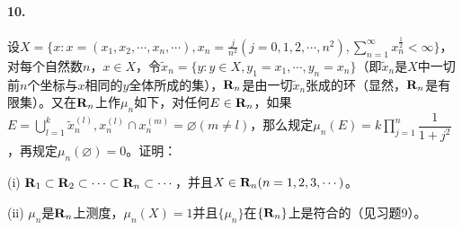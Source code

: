 \documentclass[12pt, a4paper, oneside]{ctexart}
\begin{document}
\paragraph{10.}设$\displaystyle X=\{x:x=(x_1,x_2,\cdots, x_n,\cdots),x_n=\frac{j}{n^2}(j=0,1,2,\cdots,n^2),\sum\limits_{n=1}^{\infty}x_n^{\frac{1}{2}}<\infty\}$，对每个自然数$n$，$x\in X$，令$\widetilde{x}_n = \{y:y\in X, y_1=x_1,\cdots,y_n=x_n\}$（即$\widetilde{x}_n$是$X$中一切前$n$个坐标与$x$相同的$y$全体所成的集），$\mathbf{R}_n$是由一切$\widetilde{x}_n$张成的环（显然，$\mathbf{R}_n$是有限集）。又在$\mathbf{R}_n$上作$\mu_n$如下，对任何$E\in\mathbf{R}_n$，如果$\displaystyle E=\bigcup\limits_{l=1}^k\widetilde{x}_n^{(l)},x_n^{(l)}\cap x_n^{(m)}=\varnothing(m\neq l)$，那么规定$\displaystyle \mu_n(E) = k\prod\limits_{j=1}^n\dfrac{1}{1+j^2}$，再规定$\mu_n(\varnothing) = 0$。证明：

(i) $\mathbf{R}_1\subset \mathbf{R}_2\subset \cdots\subset \mathbf{R}_n\subset \cdots$，并且$X\in\mathbf{R}_n(n=1,2,3,\cdots)$。

(ii) $\mu_n$是$\mathbf{R}_n$上测度，$\mu_n(X)=1$并且$\{\mu_n\}$在$\{\mathbf{R}_n\}$上是符合的（见习题9）。
\end{document}
